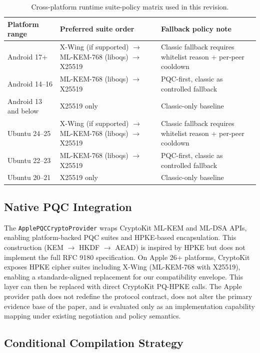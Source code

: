 \documentclass[10pt,journal,compsoc]{IEEEtran}
\begin{document}
\begin{table}[!tp]
\centering
\scriptsize
\caption{Cross-platform runtime suite-policy matrix used in this revision.}
\label{tab:supp-cross-platform-policy}
\begin{tabular}{@{}lll@{}}
\toprule
Platform range & Preferred suite order & Fallback policy note \\
\midrule
Android 17+ & X-Wing (if supported) $\rightarrow$ ML-KEM-768 (liboqs) $\rightarrow$ X25519 & Classic fallback requires whitelist reason + per-peer cooldown \\
Android 14--16 & ML-KEM-768 (liboqs) $\rightarrow$ X25519 & PQC-first, classic as controlled fallback \\
Android 13 and below & X25519 only & Classic-only baseline \\
Ubuntu 24--25 & X-Wing (if supported) $\rightarrow$ ML-KEM-768 (liboqs) $\rightarrow$ X25519 & Classic fallback requires whitelist reason + per-peer cooldown \\
Ubuntu 22--23 & ML-KEM-768 (liboqs) $\rightarrow$ X25519 & PQC-first, classic as controlled fallback \\
Ubuntu 20--21 & X25519 only & Classic-only baseline \\
\bottomrule
\end{tabular}
\end{table}

\subsection*{Native PQC Integration}

The \texttt{ApplePQCCryptoProvider} wraps CryptoKit ML-KEM and ML-DSA
APIs, enabling platform-backed PQC suites and HPKE-based encapsulation.
This construction (KEM $\rightarrow$ HKDF $\rightarrow$ AEAD) is
inspired by HPKE but does not implement the full RFC 9180
specification. On Apple 26+ platforms, CryptoKit exposes HPKE cipher
suites including X-Wing (ML-KEM-768 with X25519), enabling a
standards-aligned replacement for our compatibility envelope. This
layer can then be replaced with direct CryptoKit PQ-HPKE calls. The
Apple provider path does not redefine the protocol contract, does not
alter the primary evidence base of the paper, and is evaluated only as
an implementation capability mapping under existing negotiation and
policy semantics.

\subsection*{Conditional Compilation Strategy}
\end{document}

